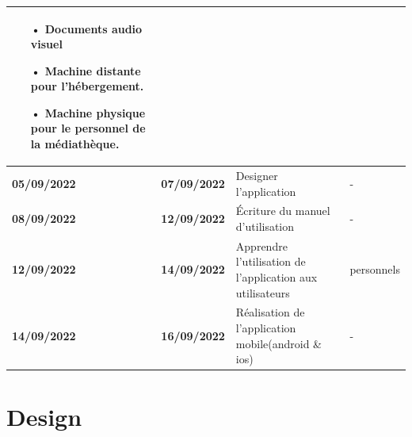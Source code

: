 \documentclass[12pt,a4paper]{article}
\begin{document}
\begin{center}
\begin{tabular}{|p{2.2cm}|p{2.2cm}|p{6.5cm}|p{6.5cm}|}
\begin{itemize}
\item[•] Documents audio visuel
\item[•] Machine distante pour l'hébergement.
\item[•] Machine physique pour le personnel de la médiathèque.
\end{itemize} \\
\hline 
\textbf{05/09/2022} & \textbf{07/09/2022} & Designer l'application & - \\
\hline 
\textbf{08/09/2022} & \textbf{12/09/2022} & Écriture du manuel d'utilisation & - \\ 
\hline
\textbf{12/09/2022} & \textbf{14/09/2022} & Apprendre l'utilisation de l'application aux utilisateurs & personnels\\ 
\hline  
\textbf{14/09/2022} & \textbf{16/09/2022} & Réalisation de l'application mobile(android \& ios) & -\\ 
\hline 
\end{tabular} 
\end{center}

\section{Design}
\end{document}
